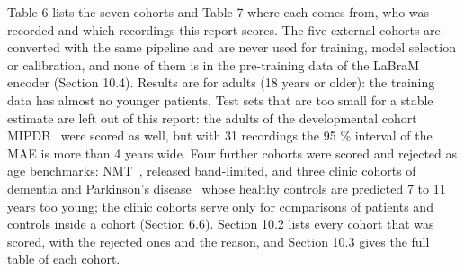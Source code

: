 \documentclass[11pt,a4paper]{article}
\begin{document}
Table 6 lists the seven cohorts and Table 7 where each comes from, who was recorded and which recordings this report scores. The five external cohorts are converted with the same pipeline and are never used for training, model selection or calibration, and none of them is in the pre-training data of the LaBraM encoder (Section 10.4). Results are for adults (18 years or older): the training data has almost no younger patients. Test sets that are too small for a stable estimate are left out of this report: the adults of the developmental cohort MIPDB~\citep{langer2017mipdb} were scored as well, but with 31 recordings the 95 \% interval of the MAE is more than 4 years wide. Four further cohorts were scored and rejected as age benchmarks: NMT~\citep{khan2022nmt}, released band-limited, and three clinic cohorts of dementia and Parkinson's disease~\citep{miltiadous2023ahepa,singh2023iowapd,katzir2026telavivpd} whose healthy controls are predicted 7 to 11 years too young; the clinic cohorts serve only for comparisons of patients and controls inside a cohort (Section 6.6). Section 10.2 lists every cohort that was scored, with the rejected ones and the reason, and Section 10.3 gives the full table of each cohort.
\end{document}
